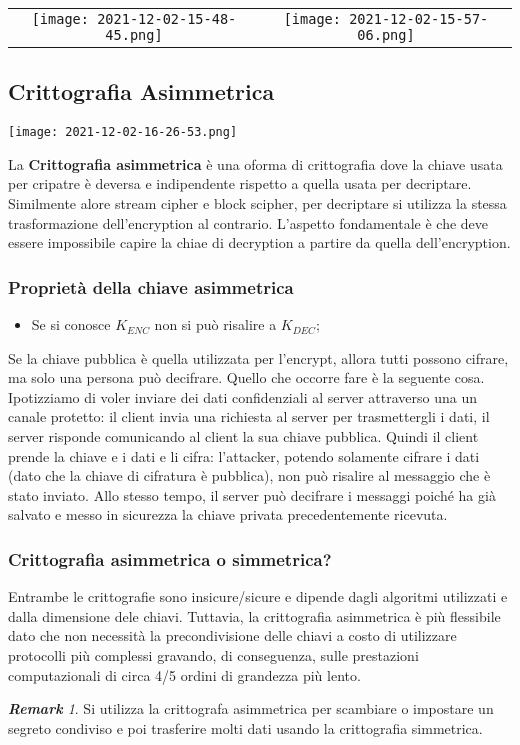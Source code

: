 \documentclass{article}
\theoremstyle{remark}
\newtheorem*{remark}{\textbf{Remark}}
\begin{document}
\begin{tabular}{cc}
	\texttt{[image: 2021-12-02-15-48-45.png]} &
	\texttt{[image: 2021-12-02-15-57-06.png]}
\end{tabular}
\subsection{Crittografia Asimmetrica}
\begin{center}
	\texttt{[image: 2021-12-02-16-26-53.png]}
\end{center}
La \textbf{Crittografia asimmetrica} è una oforma di crittografia dove la chiave usata per cripatre è deversa e indipendente rispetto a quella usata per decriptare.
Similmente alore stream cipher e block scipher, per decriptare si utilizza la stessa trasformazione dell'encryption al contrario.\newline
L'aspetto fondamentale è che deve essere impossibile capire la chiae di decryption a partire da quella dell'encryption.
\subsubsection{Proprietà della chiave asimmetrica}
\begin{itemize}
	\item Se si conosce \(K_{ENC}\) non si può risalire a \(K_{DEC}\);
\end{itemize}
Se la chiave pubblica è quella utilizzata per l'encrypt, allora tutti possono cifrare, ma solo una persona può decifrare.\newline
Quello che occorre fare è la seguente cosa. Ipotizziamo di voler inviare dei dati confidenziali al server attraverso una un canale protetto: il client invia una richiesta al server per trasmettergli i dati, il server risponde comunicando al client la sua
chiave pubblica. Quindi il client prende la chiave e i dati e li cifra: l'attacker, potendo solamente cifrare i dati (dato che la chiave di cifratura è pubblica), non può risalire al messaggio che è stato inviato.
Allo stesso tempo, il server può decifrare i messaggi poiché ha già salvato e messo in sicurezza la chiave privata precedentemente ricevuta.
\subsubsection{Crittografia asimmetrica o simmetrica?}
Entrambe le crittografie sono insicure/sicure e dipende dagli algoritmi utilizzati e dalla dimensione dele chiavi. Tuttavia, la crittografia asimmetrica è più flessibile dato che non necessità la precondivisione delle chiavi a costo di utilizzare protocolli più complessi gravando, di conseguenza,
sulle prestazioni computazionali di circa 4/5 ordini di grandezza più lento.
\begin{remark}
	Si utilizza la crittografa asimmetrica per scambiare o impostare un segreto condiviso e poi trasferire molti dati usando la crittografia simmetrica.
\end{remark}
\end{document}
